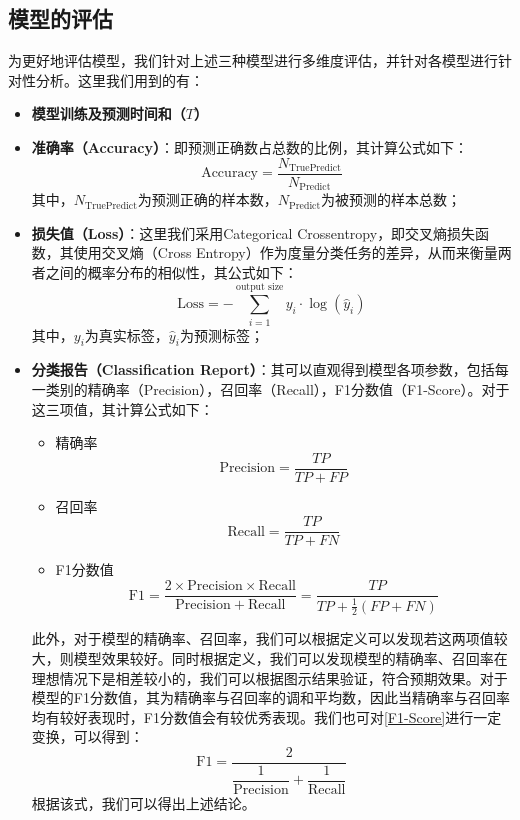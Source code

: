 \documentclass{MathorCupmodeling}
\begin{document}
	\subsection{模型的评估}
	为更好地评估模型，我们针对上述三种模型进行多维度评估，并针对各模型进行针对性分析。这里我们用到的有：
	\begin{itemize}
		\item \textbf{模型训练及预测时间和（$T$）}
		\item \textbf{准确率（Accuracy）}：即预测正确数占总数的比例，其计算公式如下：
			\begin{equation}
				\mathrm{Accuracy}=\frac{N_{\mathrm{TruePredict}}}{N_{\mathrm{Predict}}} \label{Accuracy}
				\end{equation}
			其中，$N_{\mathrm{TruePredict}}$为预测正确的样本数，$N_{\mathrm{Predict}}$为被预测的样本总数；
		\item \textbf{损失值（Loss）}：这里我们采用Categorical Crossentropy\textcolor{blue}{\cite{损失函数}}，即交叉熵损失函数，其使用交叉熵（Cross Entropy）作为度量分类任务的差异，从而来衡量两者之间的概率分布的相似性，其公式如下：
			\begin{equation}
				\text{Loss}=-\sum_{i=1}^{\text{output size}}y_i\cdot\log\left(\hat{y}_i\right)
			\end{equation}
			其中，$y_i$为真实标签，$\hat{y}_i$为预测标签；
		\item \textbf{分类报告（Classification Report）}：其可以直观得到模型各项参数，包括每一类别的精确率（Precision），召回率（Recall），F1分数值（F1-Score）。对于这三项值，其计算公式如下：
		\begin{itemize}
			\item {\heiti 精确率}
			\begin{equation}
				\mathrm{Precision} = \frac{TP}{TP+FP} \label{Precision}
			\end{equation}
			\item {\heiti 召回率}
			\begin{equation}
				\mathrm{Recall} = \frac{TP}{TP+FN} \label{Recall}
			\end{equation}
			\item {\heiti F1分数值} 
			\begin{equation}
				\mathrm{F}1 = \frac{2\times \mathrm{Precision}\times \mathrm{Recall}}{\mathrm{Precision}+\mathrm{Recall}}=\frac{TP}{TP+\frac{1}{2}\left(FP+FN\right)} \label{F1-Score}
			\end{equation}
		\end{itemize}
		此外，对于模型的精确率、召回率，我们可以根据定义可以发现若这两项值较大，则模型效果较好。同时根据定义，我们可以发现模型的精确率、召回率在理想情况下是相差较小的，我们可以根据图示结果验证，符合预期效果。对于模型的F1分数值，其为精确率与召回率的调和平均数\textcolor{blue}{\cite{模型评测}}，因此当精确率与召回率均有较好表现时，F1分数值会有较优秀表现。我们也可对\textcolor{blue}{\eqref{F1-Score}}进行一定变换，可以得到：
		\begin{equation}
			\mathrm{F}1=\frac{2}{\dfrac{1}{\mathrm{Precision}}+\dfrac{1}{\mathrm{Recall}}} \label{ReacllNew}
		\end{equation}
		根据该式，我们可以得出上述结论。


\end{itemize}
\end{document}
